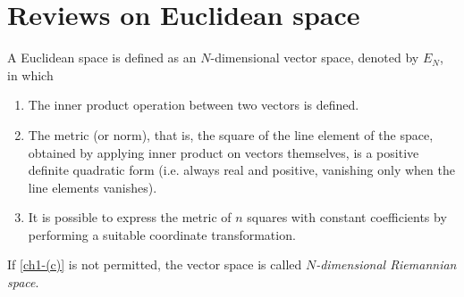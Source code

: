 \chapter{Reviews on Euclidean space}
\begin{definition}


A Euclidean space is defined as an $N$-dimensional vector space, denoted by $E_N$, in which
\begin{enumerate}[label=(\alph*)]
\item The inner product operation between two vectors is defined. 
\item The metric (or norm), that is, the square of the line element of the space, obtained by applying inner product on vectors themselves, is a positive definite quadratic form (i.e. always real and positive, vanishing only when the line elements vanishes). 
\item \label{ch1-(c)} It is possible to express the metric of $n$ squares with constant coefficients by performing a suitable coordinate transformation.
\end{enumerate}


\begin{note}
If \ref{ch1-(c)} is not permitted, the vector space is called \emph{$N$-dimensional Riemannian space}. 
\end{note}


\end{definition}

